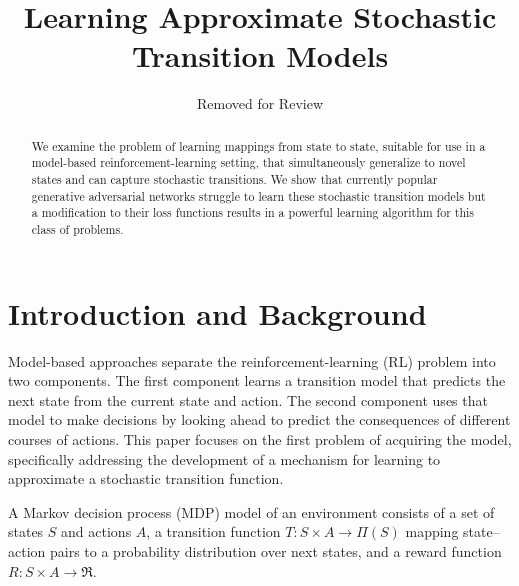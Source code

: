 \documentclass[letterpaper]{article} %
\begin{document}
%
\title{Learning Approximate Stochastic Transition Models}
\author{Removed for Review\\
}
\maketitle
\begin{abstract}
We examine the problem of learning mappings from state to state, suitable for use in a model-based reinforcement-learning setting, that simultaneously generalize to novel states and can capture stochastic transitions. We show that currently popular generative adversarial networks struggle to learn these stochastic transition models but a modification to their loss functions results in a powerful learning algorithm for this class of problems.
\end{abstract}

\section{Introduction and Background}

Model-based approaches separate the reinforcement-learning (RL) problem into two components. The first component learns a transition model that predicts the next state from the current state and action. The second component uses that model to make decisions by looking ahead to predict the consequences of different courses of actions. This paper focuses on the first problem of acquiring the model, specifically addressing the development of a mechanism for learning to approximate a stochastic transition function.


A Markov decision process (MDP) model of an environment consists of a set of states $S$ and actions $A$, a transition function $T:S\times A \rightarrow \Pi(S)$ mapping state--action pairs to a probability distribution over next states, and a reward function $R:S\times A \rightarrow \Re$.
\end{document}
